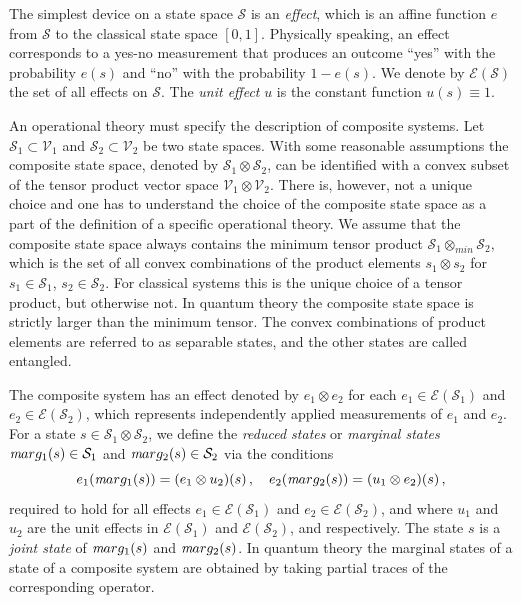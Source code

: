 \documentclass[12pt]{article}
\theoremstyle{definition}
\def\marg{\textit marg}
\begin{document}
The simplest device on a state space $\mathcal{S}$ is an \emph{effect}, which is an affine function $e$ from $\mathcal{S}$ to the classical state space $[0,1]$. Physically speaking, an effect corresponds to a yes-no measurement that produces an outcome ``yes'' with the probability $e(s)$ and ``no'' with the probability $1-e(s)$. We denote by $\mathcal{E}(\mathcal{S})$ the set of all effects on $\mathcal{S}$. The \emph{unit effect} $u$ is the constant function $u(s)\equiv 1$.

An operational theory must specify the description of composite systems. 
Let $\mathcal{S}_1 \subset \mathcal{V}_1$ and $\mathcal{S}_2 \subset \mathcal{V}_2$ be two state spaces. 
With some reasonable assumptions the composite state space, denoted by $\mathcal{S}_1  \otimes \mathcal{S}_2$, 
can be identified with a convex subset of the tensor product vector space  $\mathcal{V}_1\otimes \mathcal{V}_2$. 
There is, however, not a unique choice \cite{NaPh69} and one has to understand the choice of the composite state space as a part of the definition of a specific operational theory.
We assume that the composite state space always contains the minimum tensor product $\mathcal{S}_1 \otimes_{min} \mathcal{S}_2$, which is the set of all convex combinations of the product elements $s_1\otimes s_2$ 
for $s_1\in\mathcal{S}_1$, $s_2\in\mathcal{S}_2$.
For classical systems this is the unique choice of a tensor product, but otherwise not.  
In quantum theory the composite state space is strictly larger than the minimum tensor. 
The convex combinations of product elements are referred to as separable states, and the other states are called entangled. 


The composite system has an effect denoted by $e_1 \otimes e_2$ 
for each $e_1 \in \mathcal{E}(\mathcal{S}_1)$ and 
$e_2\in \mathcal{E}(\mathcal{S}_2)$, which represents independently applied measurements of 
$e_1$ and $e_2$. 
For a state $s\in\mathcal{S}_1  \otimes \mathcal{S}_2$, we define the \emph{reduced states} or \emph{marginal states} $\marg_1(s)\in\mathcal{S}_1$ and $\marg_2(s)\in\mathcal{S}_2$ via the conditions
\begin{equation}
e_1( \marg_1(s)) = (e_1 \otimes u_2)(s) \, , \quad e_2(\marg_2(s)) = (u_1 \otimes e_2)(s) \, ,
\end{equation}
required to hold for all effects $e_1\in \mathcal{E}(\mathcal{S}_1)$ and $e_2\in\mathcal{E}(\mathcal{S}_2)$, and where $u_1$ and $u_2$ are the unit effects in $\mathcal{E}(\mathcal{S}_1)$ and $\mathcal{E}(\mathcal{S}_2)$, and respectively.
The state $s$ is a \emph{joint state} of $\marg_1(s)$ and $\marg_2(s)$.
In quantum theory the marginal states of a state of a composite system are obtained by taking partial traces of the corresponding operator. 
\end{document}
